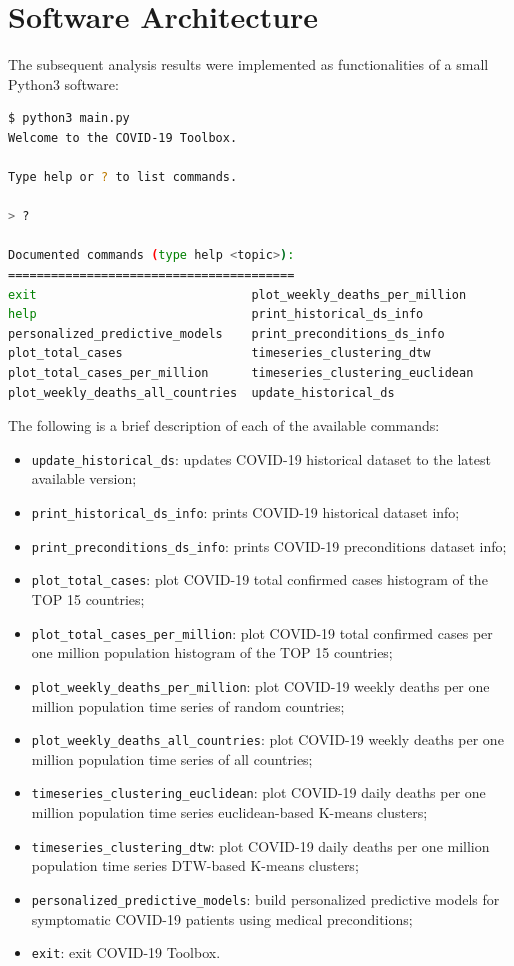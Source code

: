 \documentclass[11pt,a4paper]{article}
\begin{document}
\section{Software Architecture}
The subsequent analysis results were implemented as functionalities of a small
Python3 software:
\begin{lstlisting}[language=bash,frame=single]
$ python3 main.py 
Welcome to the COVID-19 Toolbox.

Type help or ? to list commands.

> ?

Documented commands (type help <topic>):
========================================
exit                              plot_weekly_deaths_per_million
help                              print_historical_ds_info
personalized_predictive_models    print_preconditions_ds_info
plot_total_cases                  timeseries_clustering_dtw
plot_total_cases_per_million      timeseries_clustering_euclidean
plot_weekly_deaths_all_countries  update_historical_ds
\end{lstlisting}
The following is a brief description of each of the available commands:
\begin{itemize}
    \item \texttt{update\_historical\_ds}: updates COVID-19 historical dataset to
    the latest available version;
    \item \texttt{print\_historical\_ds\_info}: prints COVID-19 historical dataset
    info;
    \item \texttt{print\_preconditions\_ds\_info}: prints COVID-19 preconditions
    dataset info;
    \item \texttt{plot\_total\_cases}: plot COVID-19 total confirmed cases
    histogram of the TOP 15 countries;
    \item \texttt{plot\_total\_cases\_per\_million}: plot COVID-19 total confirmed
    cases per one million population histogram of the TOP 15 countries;
    \item \texttt{plot\_weekly\_deaths\_per\_million}: plot COVID-19 weekly deaths
    per one million population time series of random countries;
    \item \texttt{plot\_weekly\_deaths\_all\_countries}: plot COVID-19 weekly deaths
    per one million population time series of all countries;
    \item \texttt{timeseries\_clustering\_euclidean}: plot COVID-19 daily deaths
    per one million population time series euclidean-based K-means clusters;
    \item \texttt{timeseries\_clustering\_dtw}: plot COVID-19 daily deaths per one
    million population time series DTW-based K-means clusters;
    \item \texttt{personalized\_predictive\_models}: build personalized predictive
    models for symptomatic COVID-19 patients using medical preconditions;
    \item \texttt{exit}: exit COVID-19 Toolbox.
\end{itemize}
\end{document}
